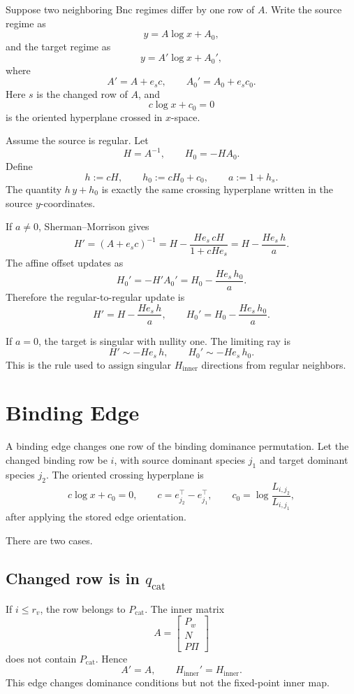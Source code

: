 \documentclass[11pt]{article}
\newcommand{\logx}{\log x}
\newcommand{\et}[1]{e_{#1}^{\top}}
\begin{document}
Suppose two neighboring Bnc regimes differ by one row of \(A\).  Write the
source regime as
\[
    y=A\logx+A_0,
\]
and the target regime as
\[
    y=A'\logx+A_0',
\]
where
\[
    A' = A + e_s c,
    \qquad
    A_0'=A_0+e_s c_0 .
\]
Here \(s\) is the changed row of \(A\), and
\[
    c\logx+c_0=0
\]
is the oriented hyperplane crossed in \(x\)-space.

Assume the source is regular.  Let
\[
    H=A^{-1},
    \qquad
    H_0=-HA_0 .
\]
Define
\[
    h := cH,
    \qquad
    h_0 := cH_0+c_0,
    \qquad
    a := 1+h_s .
\]
The quantity \(h\,y+h_0\) is exactly the same crossing hyperplane written in the
source \(y\)-coordinates.

If \(a\ne 0\), Sherman--Morrison gives
\[
    H'=(A+e_sc)^{-1}
       =H-\frac{He_s\,cH}{1+cHe_s}
       =H-\frac{He_s\,h}{a}.
\]
The affine offset updates as
\[
    H_0'=-H'A_0'
        =H_0-\frac{He_s\,h_0}{a}.
\]
Therefore the regular-to-regular update is
\[
    \boxed{
    H'=H-\frac{He_s\,h}{a},
    \qquad
    H_0'=H_0-\frac{He_s\,h_0}{a}.
    }
\]

If \(a=0\), the target is singular with nullity one.  The limiting ray is
\[
    \boxed{
    H'\sim -He_s\,h,
    \qquad
    H_0'\sim -He_s\,h_0.
    }
\]
This is the rule used to assign singular \(H_{\mathrm{inner}}\) directions from
regular neighbors.

\section{Binding Edge}

A binding edge changes one row of the binding dominance permutation.  Let the
changed binding row be \(i\), with source dominant species \(j_1\) and target
dominant species \(j_2\).  The oriented crossing hyperplane is
\[
    c\logx+c_0=0,
    \qquad
    c=\et{j_2}-\et{j_1},
    \qquad
    c_0=\log\frac{L_{i,j_2}}{L_{i,j_1}},
\]
after applying the stored edge orientation.

There are two cases.

\subsection*{Changed row is in \(q_{\mathrm{cat}}\)}

If \(i\le r_v\), the row belongs to \(P_{\mathrm{cat}}\).  The inner matrix
\[
    A=\begin{bmatrix}P_w\\N\\P\Pi\end{bmatrix}
\]
does not contain \(P_{\mathrm{cat}}\).  Hence
\[
    A'=A,
    \qquad
    H_{\mathrm{inner}}'=H_{\mathrm{inner}}.
\]
This edge changes dominance conditions but not the fixed-point inner map.
\end{document}
